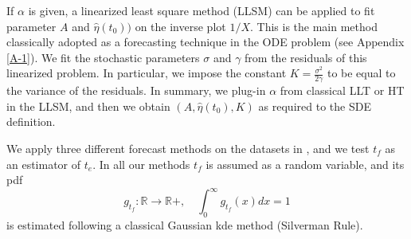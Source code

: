 \documentclass{article}
\begin{document}
If $\alpha$ is given, a linearized least square method (LLSM) can be applied to fit parameter $A$ and $\hat\eta(t_0))$ on the inverse plot $1/X$. This is the main method classically adopted as a forecasting technique in the ODE problem (see Appendix \ref{A-1}). We fit the stochastic parameters $\sigma$ and $\gamma$ from the residuals of this linearized problem. In particular, we impose the constant $K=\frac{\sigma^2}{2\gamma}$ to be equal to the variance of the residuals. In summary, we plug-in $\alpha$ from classical LLT or HT in the LLSM, and then we obtain $\left(A,\hat\eta(t_0),K\right)$ as required to the SDE definition.

We apply three different forecast methods on the datasets in \cite{Voight1988}, and we test $t_f$ as an estimator of $t_e$. In all our methods $t_f$ is assumed as a random variable, and its pdf
$$g_{t_f}:\mathbb R\rightarrow \mathbb R+,\quad \int_0^\infty g_{t_f}(x) dx=1$$
is estimated following a classical Gaussian kde method (Silverman Rule).
\end{document}
